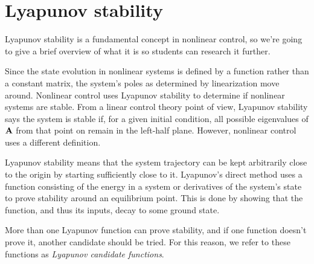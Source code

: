 \section{Lyapunov stability}

Lyapunov stability is a fundamental concept in nonlinear control, so we're going
to give a brief overview of what it is so students can research it further.

Since the \gls{state} evolution in nonlinear \glspl{system} is defined by a
function rather than a constant matrix, the \gls{system}'s poles as determined
by \gls{linearization} move around. Nonlinear control uses Lyapunov stability to
determine if nonlinear \glspl{system} are stable. From a linear control theory
point of view, Lyapunov stability says the \gls{system} is stable if, for a
given initial condition, all possible eigenvalues of $\mathbf{A}$ from that point
on remain in the left-half plane. However, nonlinear control uses a different
definition.

Lyapunov stability means that the \gls{system} trajectory can be kept
arbitrarily close to the origin by starting sufficiently close to it. Lyapunov's
direct method uses a function consisting of the energy in a \gls{system} or
derivatives of the \gls{system}'s \gls{state} to prove stability around an
equilibrium point. This is done by showing that the function, and thus its
inputs, decay to some ground state.

More than one Lyapunov function can prove stability, and if one function doesn't
prove it, another candidate should be tried. For this reason, we refer to these
functions as \textit{Lyapunov candidate functions}.
